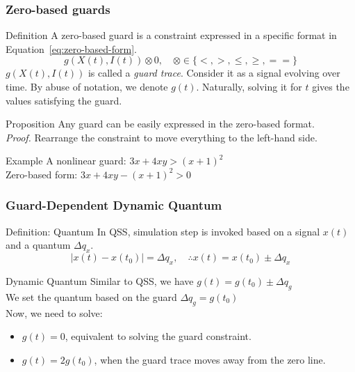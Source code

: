 \begin{frame}[c] \frametitle{ Zero-based guards }
	\vspace{-5pt}
	\begin{block}{Definition}
		A zero-based guard is a constraint expressed in a specific format in Equation~\eqref{eq:zero-based-form}.
		\begin{equation}
			g(X(t), I(t)) \otimes 0, \quad \otimes \in \{<, >, \leq, \geq, == \}
			\label{eq:zero-based-form}
		\end{equation}
		$g(X(t), I(t))$ is called a \emph{guard trace}. Consider it as a signal evolving over time. By abuse of notation, we denote $g(t)$. Naturally, solving it for $t$ gives the values satisfying the guard. 
	\end{block}
	
	\begin{block}{Proposition}
		Any guard can be easily expressed in the zero-based format.\\
		\emph{Proof.} Rearrange the constraint to move everything to the left-hand side.
	\end{block}
	 
	\begin{block}{Example}
		A nonlinear guard: $ 3x + 4xy > (x+1)^2$ \\
		Zero-based form: $ 3x + 4xy - (x+1)^2 > 0$
	\end{block}
\end{frame}

\begin{frame}[c] \frametitle{ Guard-Dependent Dynamic Quantum }
	\begin{block}{Definition: Quantum }
		In QSS, simulation step is invoked based on a signal $x(t)$ and a quantum $\Delta q_x$.
		\begin{equation}
			| x(t) - x(t_0) | = \Delta q_x, \quad \therefore x(t) = x(t_0) \pm \Delta q_x
		\end{equation}
	\end{block}
	
	\begin{block}{ Dynamic Quantum }
		Similar to QSS, we have $g(t) = g(t_0) \pm \Delta q_g$ \\
		We set the quantum based on the guard $\Delta q_g = g(t_0)$\\
		Now, we need to solve:
		\begin{itemize}
			\item $g(t) = 0$, equivalent to solving the guard constraint.
			\item $g(t) = 2 g(t_0)$, when the guard trace moves away from the zero line.
		\end{itemize}	
	\end{block}
\end{frame}

